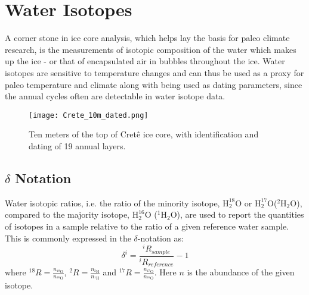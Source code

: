 \documentclass[../../CompleteThesis2/Complete_2ndDraft]{subfiles}
\begin{document}
\section[Water Isotopes][Water Isotopes]{Water Isotopes}
\label{Sec:Ice_WaterIsotopes}

A corner stone in ice core analysis, which helps lay the basis for paleo climate research, is the measurements of isotopic composition of the water which makes up the ice - or that of encapsulated air in bubbles throughout the ice. Water isotopes are sensitive to temperature changes and can thus be used as a proxy for paleo temperature and climate along with being used as dating parameters, since the annual cycles often are detectable in water isotope data.

\begin{figure}[h]
	\centering
	\texttt{[image: Crete\_10m\_dated.png]}
	\caption[10 m of Crête ice core with dating.]{\small Ten meters of the top of Cretê ice core, with identification and dating of 19 annual layers.}
	\label{Fig:ICE_Crete_10m_dated}
\end{figure}


\subsection[$\delta$ Notation]{$\delta$ Notation}
\label{Subsec:Ice_WaterIsotopes_deltaNotation}

Water isotopic ratios, i.e. the ratio of the minority isotope, ${\text{H}_2^{18}\text{O}}$ or ${\text{H}_2^{17}\text{O}}$($^2\text{H}_2\text{O}$), compared to the majority isotope, ${\text{H}_2^{16}\text{O}}$ ($^1\text{H}_2\text{O}$), are used to report the quantities of isotopes in a sample relative to the ratio of a given reference water sample. This is commonly expressed in the $\delta$-notation as:
\begin{equation}
	\delta^i = \frac{^iR_{sample}}{^iR_{reference}} - 1		
\end{equation}
where $^{18}R = \frac{n_{^{18}\text{O}}}{n_{^{16}\text{O}}}$, $^{2}R = \frac{n_{^{2}\text{H}}}{n_{^{1}\text{H}}}$  and $^{17}R = \frac{n_{^{17}\text{O}}}{n_{^{16}\text{O}}}$. Here $n$ is the abundance of the given isotope.
\end{document}
